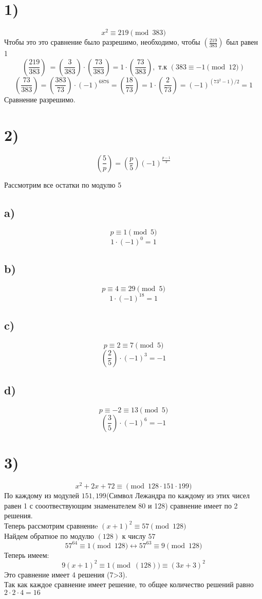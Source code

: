 

	\section*{1)}
	$$x^2 \equiv 219 \pmod{383}$$
	Чтобы это это сравнение было разрешимо, необходимо, чтобы $\left(\frac{219}{383}\right)$ был равен 1\\
	$$\left(\frac{219}{383}\right)\  = \left(\frac{3}{383}\right)\cdot \left(\frac{73}{383}\right) = 1\cdot \left(\frac{73}{383}\right), \text{ т.к } \left(383\equiv-1\pmod{12}\right)$$
	$$\left(\frac{73}{383}\right) = \left(\frac{383}{73}\right)\cdot (-1)^{6876} =  \left(\frac{18}{73}\right) = 1\cdot \left(\frac{2}{73}\right) = (-1)^{(73^2-1)/2} = 1$$
	Сравнение разрешимо. 
	\section*{2)}
	$$\left(\frac{5}{p}\right) = \left(\frac{p}{5}\right)(-1)^{\frac{p-1}{2}}$$
	
 	Рассмотрим все остатки по модулю 5 \\
 	\subsection*{a)}
 	$$p\equiv 1\pmod5$$
 	$$1\cdot (-1)^{0} = 1$$
 	 	\subsection*{b)}
 	$$p\equiv 4\equiv29 \pmod5$$
 	$$1\cdot (-1)^{18} = 1$$
  	 	\subsection*{c)}
 $$p\equiv 2\equiv7 \pmod5$$
 $$\left(\frac{2}{5}\right)\cdot (-1)^{3} = -1$$
   	 	\subsection*{d)}
 $$p\equiv -2\equiv13 \pmod5$$
 $$\left(\frac{3}{5}\right)\cdot (-1)^{6} = -1$$
 \section*{3)}
 $$x^2+2x+72\equiv\pmod{128\cdot151\cdot199}$$
 По каждому из  модулей $151, 199$(Символ Лежандра по каждому из этих чисел равен 1 с сооотвествующим знаменателем 80 и 128) сравнение имеет по 2 решения.  \\
 Теперь рассмотрим сравнениe $(x+1)^2\equiv57 \pmod{128}$ \\
 Найдем обратное по модулю $(128)$ к числу $57$ \\
 $$57^{64} \equiv 1\pmod{128}\leftrightarrow 57^{63}\equiv 9\pmod{128}$$
Теперь имеем: \\
$$9(x+1)^2\equiv1\pmod(128)\equiv (3x+3)^2$$
Это сравнение имеет 4 решения (7>3). \\
Так как каждое сравнение имеет решение, то общее количество решений равно $2\cdot2\cdot4 =16$
